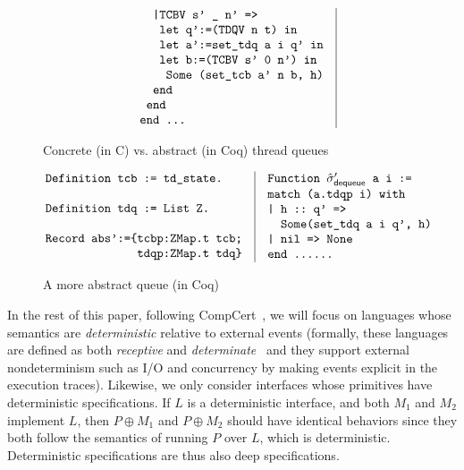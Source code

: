 \begin{figure}[t]
$$\begin{array}{l|l}
\begin{array}[t]{l}
\verb+  |TCBV s' _ n' =>+\\
\verb+   let q':=(TDQV n t) in+\\
\verb+   let a':=set_tdq a i q' in+\\
\verb+   let b:=(TCBV s' 0 n') in+\\
\verb+    Some (set_tcb a' n b, h)+\\
\verb+  end+\\
\verb+ end+\\
\verb+end ...+
\end{array}
\end{array}
$$ 
\caption{Concrete (in C) vs. abstract (in Coq) thread queues}
\label{fig:queue}
\end{figure}
\begin{figure}[t]\scriptsize
$$
\begin{array}{l|l}
\hspace*{-2ex} 
\begin{array}[t]{l}
\verb+Definition tcb := td_state.+\\
\verb++\\
\verb+Definition tdq := List Z.+\\
\verb++\\
\verb+Record abs':={tcbp:ZMap.t tcb;+\\
\verb+              tdqp:ZMap.t tdq}+\\
\end{array}
&
\begin{array}[t]{l}
\verb+Function + \hat{\sigma}_\textsf{dequeue}' \verb+ a i :=+\\ 
\verb+match (a.tdqp i) with+\\
\verb+| h :: q' =>+\\
\verb+  Some(set_tdq a i q', h)+\\
\verb+| nil => None+\\
\verb+end ......+\\
\end{array}
\end{array}
$$ 
\caption{A more abstract queue (in Coq)}
\label{fig:queue2}
\end{figure}

In the rest of this paper, following CompCert~\cite{Leroy-backend}, we
will focus on languages whose semantics are {\em
  deterministic} relative to external events (formally, these
languages are defined as both {\em receptive} and {\em
  determinate}~\cite{sevcik13} and they support external
nondeterminism such as I/O and concurrency by making events explicit 
in the execution traces).
Likewise, we only consider interfaces whose primitives
have deterministic specifications. If $L$ is a deterministic interface, 
and both $M_1$ and $M_2$ implement $L$, then $P\oplus{}M_1$ and $P\oplus{}M_2$
should have identical behaviors since they both follow the semantics
of running $P$ over $L$, which is deterministic. Deterministic 
specifications are thus also deep specifications.

